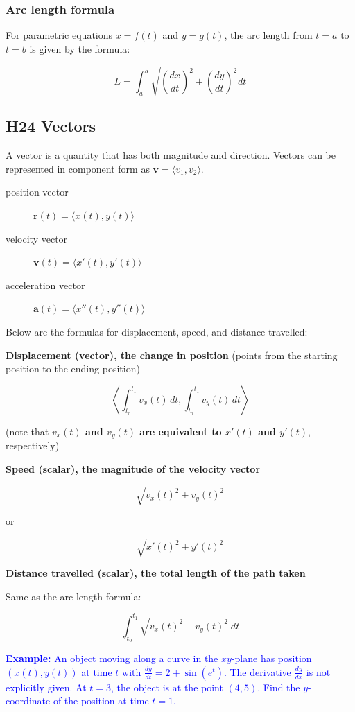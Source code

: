 \documentclass[letterpaper, 12pt]{article}
\newcommand{\example}[1]{\textcolor{blue}{\textbf{Example:} #1}}
\begin{document}
\subsubsection*{Arc length formula}

For parametric equations $x = f(t)$ and $y = g(t)$, the arc length from $t = a$ to $t = b$ is given by the formula:

$$L = \int_a^b \sqrt{\left(\frac{dx}{dt}\right)^2 + \left(\frac{dy}{dt}\right)^2} dt$$

\subsection*{H24 Vectors}

A vector is a quantity that has both magnitude and direction. Vectors can be represented in component form as $\mathbf{v} = \langle v_1, v_2 \rangle$.

\begin{description}
\item[position vector] $\mathbf{r}(t) = \langle x(t), y(t) \rangle$
\item [velocity vector] $\mathbf{v}(t) = \langle x'(t), y'(t) \rangle$
\item [acceleration vector] $\mathbf{a}(t) = \langle x''(t), y''(t) \rangle$
\end{description}

Below are the formulas for displacement, speed, and distance travelled:

\textbf{Displacement (vector), the change in position} (points from the starting position to the ending position)

$$\left \langle \int_{t_0}^{t_1} v_x(t) \, dt, \int_{t_0}^{t_1} v_y(t) \, dt \right \rangle$$

(note that \textbf{$v_x(t)$ and $v_y(t)$ are equivalent to $x'(t)$ and $y'(t)$}, respectively)

\textbf{Speed (scalar), the magnitude of the velocity vector}

$$\sqrt{v_x(t)^2 + v_y(t)^2}$$

or

$$\sqrt{x'(t)^2 + y'(t)^2}$$

\textbf{Distance travelled (scalar), the total length of the path taken}

Same as the arc length formula:

$$\int_{t_0}^{t_1} \sqrt{v_x(t)^2 + v_y(t)^2} \: dt$$

\example{An object moving along a curve in the $xy$-plane has position $(x(t), y(t))$ at time $t$ with $\frac{dy}{dt} = 2 + \sin\left(e^t\right)$. The derivative $\frac{dy}{dx}$ is not explicitly given. At $t=3$, the object is at the point $(4, 5)$. Find the $y$-coordinate of the position at time $t = 1$.}
\end{document}
